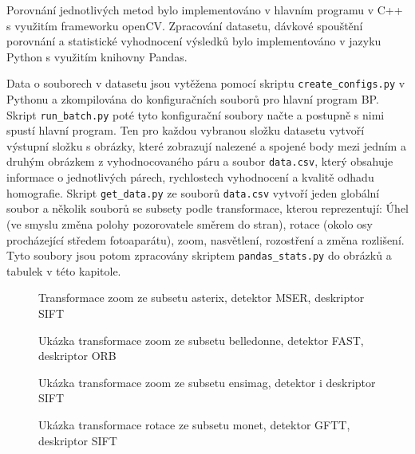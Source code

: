 
Porovnání jednotlivých metod bylo implementováno v hlavním programu v C++ s využitím frameworku
openCV. Zpracování datasetu, dávkové spouštění porovnání a statistické vyhodnocení výsledků bylo
implementováno v jazyku Python s využitím knihovny Pandas.


Data o souborech v datasetu jsou vytěžena pomocí skriptu \verb|create_configs.py| v Pythonu a zkompilována do konfiguračních souborů pro hlavní program BP. Skript \verb|run_batch.py| poté tyto konfigurační soubory načte a postupně s nimi spustí hlavní program. Ten pro každou vybranou složku datasetu vytvoří výstupní složku s obrázky, které zobrazují nalezené a spojené body mezi jedním a druhým obrázkem z vyhodnocovaného páru a soubor \verb|data.csv|, který obsahuje informace o jednotlivých párech, rychlostech vyhodnocení a kvalitě odhadu homografie. Skript \verb|get_data.py| ze souborů \verb|data.csv| vytvoří jeden globální soubor a několik souborů se subsety podle transformace, kterou reprezentují: Úhel (ve smyslu změna polohy pozorovatele směrem do stran), rotace (okolo osy procházející středem fotoaparátu), zoom, nasvětlení, rozostření a změna rozlišení. Tyto soubory jsou potom zpracovány skriptem \verb|pandas_stats.py| do obrázků a tabulek v této kapitole.


\begin{figure}[htp] 
	\caption{Transformace zoom ze subsetu asterix, detektor MSER,
		deskriptor SIFT} \label{ex_asterix}
\end{figure}

\begin{figure}[htp] 
	\caption{Ukázka transformace zoom ze subsetu belledonne, detektor FAST,
		deskriptor ORB}	\label{ex_belledonne}
\end{figure}

\begin{figure}[htp] 
	\caption{Ukázka transformace zoom ze subsetu ensimag, detektor i 
		deskriptor SIFT} \label{ex_ensimag}
\end{figure}

\begin{figure}[htp] 
	\caption{Ukázka transformace rotace ze subsetu monet, detektor GFTT, 
		deskriptor SIFT} \label{ex_MONET}
\end{figure}

